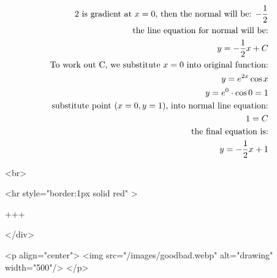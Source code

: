 $$
\begin{aligned}
\text{2 is gradient at $x=0$, then the normal will be: $-\frac{1}{2}$}\\
\text{the line equation for normal will be:}\\
y=-\frac{1}{2}x+C\\
\text{To work out C, we substitute $x=0$ into original function:}\\
y=e^{2x}\cos{x}\\
y=e^0\cdot\cos{0}=1\\
\text{substitute point ($x=0,\space y=1$), into normal line equation:}\\
1=C\\
\text{the final equation is:}\\
y=-\frac{1}{2} x +1\\
\end{aligned}
$$

<br>

<hr style="border:1px solid red" >

+++

</div>

<p align="center">
<img src="/images/goodbad.webp" alt="drawing" width="500"/>
</p>
